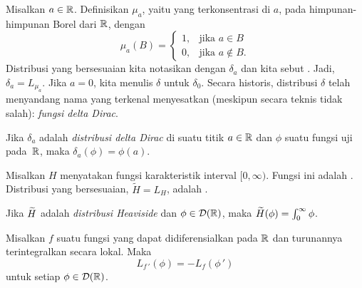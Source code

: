 \begin{notn} Misalkan $a \in \mathbb{R}$. Definisikan $\mu_a$, yaitu
 yang terkonsentrasi di $a$, pada himpunan-himpunan Borel dari $\mathbb{R}$, dengan
   \[ \mu_a(B) = \begin{cases}  1, &\text{jika $a \in B$} \\
                                0, &\text{jika $a \notin B$}.
                 \end{cases} \]
Distribusi yang bersesuaian kita notasikan dengan $\delta_a$ dan kita sebut
. Jadi, $\delta_a = L_{\mu_a}$. Jika $a = 0$, kita menulis $\delta$ untuk $\delta_0$.
Secara historis, distribusi $\delta$ telah menyandang nama yang terkenal menyesatkan (meskipun secara teknis
tidak salah): \emph{fungsi delta Dirac}.
\end{notn}

\begin{exam} Jika $\delta_a$ adalah \emph{distribusi delta Dirac} di suatu titik $a \in \mathbb{R}$ dan $\phi$ suatu fungsi uji pada~$\mathbb{R}$,
maka $\delta_a(\phi) = \phi(a)$.
\end{exam}

\begin{notn} Misalkan $H$ menyatakan fungsi karakteristik interval $[0,\infty)$. Fungsi ini adalah
. Distribusi yang bersesuaian, $\widetilde H = L_H$, adalah
.
\end{notn}

\begin{exam} Jika $\widetilde{H}$ adalah \emph{distribusi Heaviside} dan $\phi \in \mathcal{D}(\mathbb{R})$, maka $\widetilde{H}(\phi) = \int_0^\infty \phi$.
\end{exam}

\begin{exam} Misalkan $f$ suatu fungsi yang dapat didiferensialkan pada $\mathbb{R}$ dan turunannya terintegralkan secara lokal. Maka
    \begin{equation}\label{deriv_reg_distr}
        L_{f\,'}(\phi) = -L_f(\phi\,')
    \end{equation}
untuk setiap $\phi \in \mathcal{D}(\mathbb{R})$.
\end{exam}

